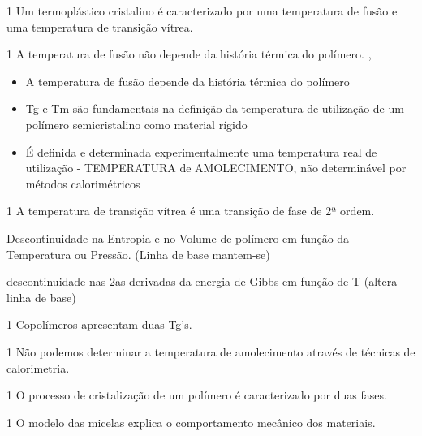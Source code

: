\documentclass[\mainfilename]{subfiles}
\begin{document}
\begin{questionBox}1{ %
    Um termoplástico cristalino é caracterizado por uma temperatura de fusão e uma temperatura de transição vítrea.
} %
    \AF
\end{questionBox}
\begin{questionBox}1{ %
    A temperatura de fusão não depende da história térmica do polímero.
} %
    \answer{}
    \AF{},
    \begin{itemize}
        \item A temperatura de fusão depende da história térmica do polímero
        \item Tg e Tm são fundamentais na definição da temperatura de utilização de um polímero semicristalino como material rígido
        \item É definida e determinada experimentalmente uma temperatura real de utilização - TEMPERATURA de AMOLECIMENTO, não determinável por métodos calorimétricos
    \end{itemize}
\end{questionBox}
\begin{questionBox}1{ %
    A temperatura de transição vítrea é uma transição de fase de 2ª ordem. 
} %
    \answer{}
    \AT{}
    \begin{description}[
        leftmargin=!,
        labelwidth=\widthof{} %
    ]
        \item[1ª Ordem:] Descontinuidade na Entropia e no Volume
        de polímero em função da Temperatura ou Pressão. (Linha de base mantem-se)
        \item[2ª Ordem:] descontinuidade nas 2as derivadas da energia de Gibbs em função de T (altera linha de base)
    \end{description}
\end{questionBox}
\begin{questionBox}1{ %
    Copolímeros apresentam duas Tg's.
} %
    \AT{}
\end{questionBox}
\begin{questionBox}1{ %
    Não podemos determinar a temperatura de amolecimento através de técnicas de calorimetria.
} %
    \AT
\end{questionBox}
\begin{questionBox}1{ %
    O processo de cristalização de um polímero é caracterizado por duas fases.
} %
    \AT
\end{questionBox}
\begin{questionBox}1{ %
    O modelo das micelas explica o comportamento mecânico dos materiais.
} %
    \AT
\end{questionBox}
\end{document}
